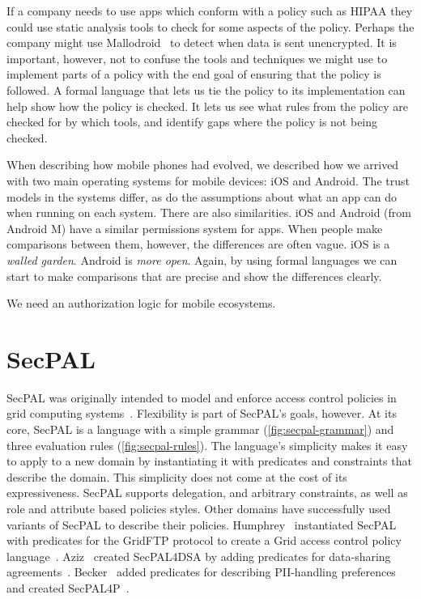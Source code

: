 \documentclass[thesis.tex]{subfiles}
\begin{document}
If a company needs to use apps which conform with a policy such as
\ac{HIPAA} they could use static analysis tools to check for some
aspects of the policy.  Perhaps the company might use
Mallodroid~\cite{fahl_why_2012} to detect when data is sent
unencrypted.  It is important, however, not to confuse the tools and
techniques we might use to implement parts of a policy with the end
goal of ensuring that the policy is followed.  A formal language that
lets us tie the policy to its implementation can help show how the
policy is checked.  It lets us see what rules from the policy are
checked for by which tools, and identify gaps where the policy is not
being checked.

When describing how mobile phones had evolved, we described how we
arrived with two main operating systems for mobile devices: iOS and
Android.  The trust models in the systems differ, as do the
assumptions about what an app can do when running on each system.
There are also similarities.  iOS and Android (from Android M) have a
similar permissions system for apps.  When people make comparisons
between them, however, the differences are often vague.  iOS is a
\emph{walled garden}.  Android is \emph{more open}.  Again, by using
formal languages we can start to make comparisons that are precise and
show the differences clearly.

We need an authorization logic for mobile ecosystems.

\section{SecPAL}


SecPAL was originally intended to model and enforce access control
policies in grid computing
systems~\cite{becker_secpal:_2010}. Flexibility is part of SecPAL's
goals, however. At its core, SecPAL is a language with a simple
grammar (\autoref{fig:secpal-grammar}) and three evaluation rules
(\autoref{fig:secpal-rules}). The language's simplicity makes it easy
to apply to a new domain by instantiating it with predicates and
constraints that describe the domain. This simplicity does not come at
the cost of its expressiveness. SecPAL supports delegation, and
arbitrary constraints, as well as role and attribute based policies
styles. Other domains have successfully used variants of SecPAL to
describe their policies. Humphrey~\etal{} instantiated SecPAL with
predicates for the GridFTP protocol to create a Grid access control
policy language~\cite{humphrey_fine-grained_2007}. Aziz~\etal{}
created SecPAL4DSA by adding predicates for data-sharing
agreements~\cite{aziz_secpal4dsa:_2011}.  Becker~\etal{} added
predicates for describing \ac{PII}-handling preferences and created
SecPAL4P~\cite{becker_framework_2009}.
\end{document}
